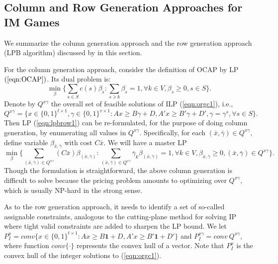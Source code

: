 \documentclass[ijoc,nonblindrev]{informs3} %
\begin{document}
\begin{APPENDICES}
\section{Column and Row Generation Approaches for IM Games} \label{section:LPBalgorithm}
We summarize the column generation approach and the row generation approach (LPB algorithm) discussed by \cite{Caprara2010LPB} in this section.

For the column generation approach, consider the definition of OCAP by LP $(\ref{eqn:OCAP})$. Its dual problem is:
\begin{equation}\label{eqn:lpbrow1}
\min_{\beta} \big\{ \sum_{s \in S}c(s)\beta_s:\sum_{s \ni k}\beta_s = 1,\forall k \in V,\beta_s \geq 0, s \in S \big\}.
\end{equation}
Denote by $Q^{x\gamma}$ the overall set of feasible solutions of ILP (\ref{eqn:orgc1}), i.e.,
$$
Q^{x\gamma} = \bigl\{ x \in \big\{0,1\big\}^{ t \times 1},\gamma \in \big\{0,1\big\}^{v \times 1}:Ax \geq B\gamma+D,A'x \geq B'\gamma+D',\gamma = \gamma^s,\forall s \in S  \bigr\}.$$
Then LP (\ref{eqn:lpbrow1}) can be re-formulated, for the purpose of doing   column generation, by enumerating all values in $Q^{x\gamma}$. Specifically,
for each $(\bar{x},\bar{\gamma}) \in Q^{x\gamma}$, define variable $\beta_{\bar{x},\bar{\gamma}}$ with cost $C\bar{x}$. We will have a master LP
\begin{equation}\label{eqn:lpbrow2}
\min_{\beta} \big\{ \sum_{(\bar{x},\bar{\gamma}) \in Q^{x\gamma}} (C\bar{x})\beta_{(\bar{x},\bar{\gamma})}: \sum_{(\bar{x},\bar{\gamma}) \in Q^{x\gamma}} \bar{\gamma}_k \beta_{(\bar{x},\bar{\gamma})}=1,\forall k \in V, \beta_{\bar{x},\bar{\gamma}}\geq 0, (\bar{x},\bar{\gamma})\in Q^{x\gamma} \big\}.
\end{equation}
Though the formulation is straightforward, the above column generation is difficult to solve because the pricing problem amounts to optimizing over $Q^{x\gamma}$, which is usually NP-hard in the strong sense.


As to the row generation approach, it needs to identify a set of so-called assignable constraints, analogous to the cutting-plane method for solving IP where tight valid constraints are added to sharpen the LP bound. We let $P_I^x = conv \big\{ x \in \big\{0,1\big\}^{ t \times 1}:Ax \geq B\textbf{1}+D,A'x \geq B'\textbf{1}+D'  \big\}$ and $P_{I}^{x\gamma} = conv ~Q^{x\gamma}$, where function $conv\{\cdot\}$ represents the convex hull of a vector. Note that $P_I^x$ is the convex hull of the integer solutions to (\ref{eqn:orgc1}).



\end{APPENDICES}
\end{document}
